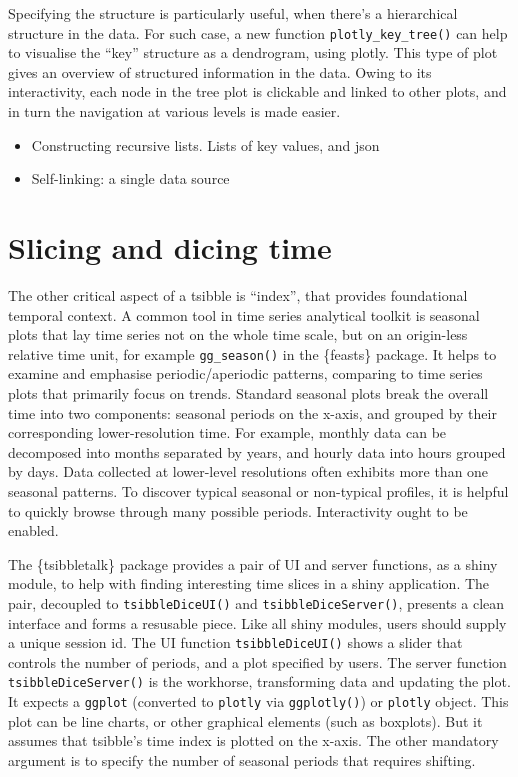 Specifying the structure is particularly useful, when there's a
hierarchical structure in the data. For such case, a new function
\texttt{plotly\_key\_tree()} can help to visualise the ``key'' structure
as a dendrogram, using plotly. This type of plot gives an overview of
structured information in the data. Owing to its interactivity, each
node in the tree plot is clickable and linked to other plots, and in
turn the navigation at various levels is made easier.

\begin{itemize}
\tightlist
\item
  Constructing recursive lists. Lists of key values, and json
\item
  Self-linking: a single data source
\end{itemize}

\hypertarget{slicing-and-dicing-time}{%
\section{Slicing and dicing time}\label{slicing-and-dicing-time}}

The other critical aspect of a tsibble is ``index'', that provides
foundational temporal context. A common tool in time series analytical
toolkit is seasonal plots that lay time series not on the whole time
scale, but on an origin-less relative time unit, for example
\texttt{gg\_season()} in the \{feasts\} package. It helps to examine and
emphasise periodic/aperiodic patterns, comparing to time series plots
that primarily focus on trends. Standard seasonal plots break the
overall time into two components: seasonal periods on the x-axis, and
grouped by their corresponding lower-resolution time. For example,
monthly data can be decomposed into months separated by years, and
hourly data into hours grouped by days. Data collected at lower-level
resolutions often exhibits more than one seasonal patterns. To discover
typical seasonal or non-typical profiles, it is helpful to quickly
browse through many possible periods. Interactivity ought to be enabled.

The \{tsibbletalk\} package provides a pair of UI and server functions,
as a shiny module, to help with finding interesting time slices in a
shiny application. The pair, decoupled to \texttt{tsibbleDiceUI()} and
\texttt{tsibbleDiceServer()}, presents a clean interface and forms a
resusable piece. Like all shiny modules, users should supply a unique
session id. The UI function \texttt{tsibbleDiceUI()} shows a slider that
controls the number of periods, and a plot specified by users. The
server function \texttt{tsibbleDiceServer()} is the workhorse,
transforming data and updating the plot. It expects a \texttt{ggplot}
(converted to \texttt{plotly} via \texttt{ggplotly()}) or
\texttt{plotly} object. This plot can be line charts, or other graphical
elements (such as boxplots). But it assumes that tsibble's time index is
plotted on the x-axis. The other mandatory argument is to specify the
number of seasonal periods that requires shifting.

